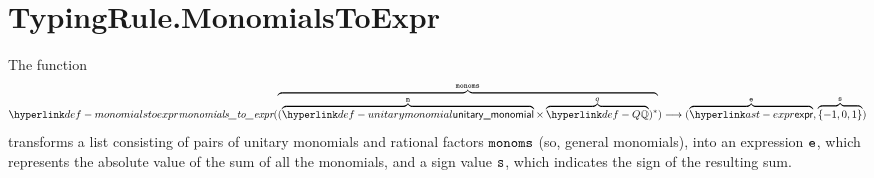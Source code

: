 
\section{TypingRule.MonomialsToExpr \label{sec:TypingRule.MonomialsToExpr}}
\hypertarget{def-monomialstoexpr}{}
The function
\[
\monomialstoexpr(\overname{(\overname{\unitarymonomial}{\vm}\times\overname{\Q}{q})^*}{\monoms}) \aslto
(\overname{\expr}{\ve},\overname{\{-1,0,1\}}{\vs})
\]
transforms a list consisting of pairs of unitary monomials and rational factors $\texttt{monoms}$ (so, general monomials),
into an expression $\texttt{e}$, which represents the absolute value of the sum of all the monomials,
and a sign value $\texttt{s}$, which indicates the sign of the resulting sum.

